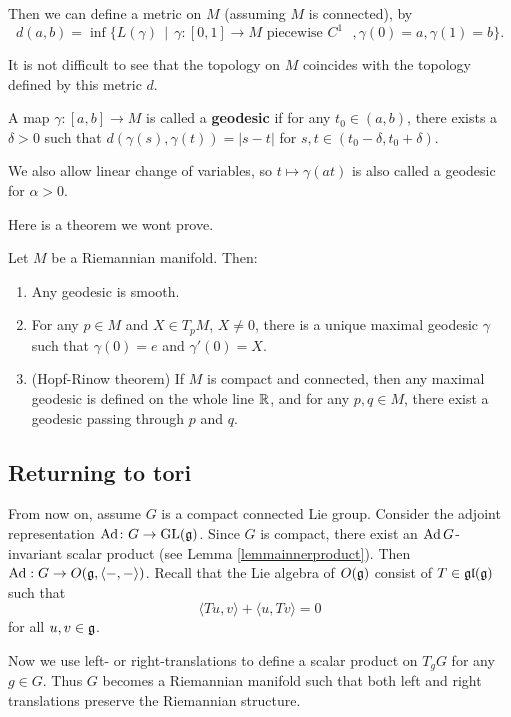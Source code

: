 \documentclass[11pt, english]{article}
\begin{document}
Then we can define a metric on $M$ (assuming $M$ is connected), by
$$
d(a,b) = \inf \{ L(\gamma) \, \mid \, \gamma:[0,1] \to M \text{ piecewise $C^1$ }, \gamma(0)=a, \gamma(1)=b \}.
$$

It is not difficult to see that the topology on $M$ coincides with the topology defined by this metric $d$.

A map $\gamma:[a,b] \to M$ is called a \textbf{geodesic} if for any $t_0 \in (a,b)$, there exists a $\delta > 0$ such that $d( \gamma(s), \gamma(t) ) = \lvert s - t \rvert$ for $s,t \in (t_0-\delta, t_0+\delta)$. 

We also allow linear change of variables, so $t \mapsto \gamma(a t)$ is also called a geodesic for $\alpha > 0$. 

Here is a theorem we wont prove.

\begin{thm}
\label{theoremgeodesic}
  Let $M$ be a Riemannian manifold. Then:
  \begin{enumerate}
  \item Any geodesic is smooth.
\item For any $p \in M$ and $X \in T_pM$, $X \neq 0$, there is a unique maximal geodesic $\gamma$ such that $\gamma(0)=e$ and $\gamma'(0)=X$.
\item (Hopf-Rinow theorem) If $M$ is compact and connected, then any maximal geodesic is defined on the whole line $\mathbb{R}$, and for any $p,q \in M$, there exist a geodesic passing through $p$ and $q$. 
  \end{enumerate}
\end{thm}

\subsection{Returning to tori}

From now on, assume $G$ is a compact connected Lie group. Consider the adjoint representation $\operatorname{Ad} \colon  G \to \operatorname{GL}(\mathfrak g)$. Since $G$ is compact, there exist an $\operatorname{Ad} G$-invariant scalar product (see Lemma \ref{lemmainnerproduct}). Then $\operatorname{Ad}:G \to O(\mathfrak g, \langle-,- \rangle)$. Recall that the Lie algebra of $O(\mathfrak g)$ consist of ${T \in \mathfrak{gl}(\mathfrak g)}$ such that
$$
\langle Tu,v  \rangle  + \langle u,Tv \rangle = 0
$$
for all $u,v \in \mathfrak g$. 

Now we use left- or right-translations to define a scalar product on $T_gG$ for any $g \in G$. Thus $G$ becomes a Riemannian manifold such that both left and right translations preserve the Riemannian structure.
\end{document}
